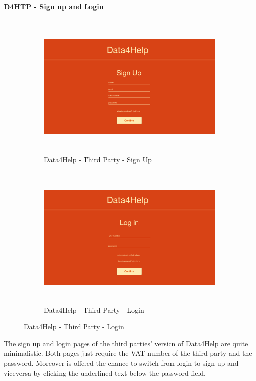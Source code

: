\paragraph{D4HTP - Sign up and Login}
\begin{figure}[H]
\centering
\begin{subfigure}{.5\textwidth}
  \centering
  \includegraphics[width=.9\linewidth, height = 7cm, keepaspectratio]{./Images/Mockups/Data4Help/D4HTP/D4HTP_SignUp.png}
  \caption{Data4Help - Third Party - Sign Up}
\end{subfigure}%
\begin{subfigure}{.5\textwidth}
  \centering
  \includegraphics[width = .9\linewidth, height = 7cm, keepaspectratio]{./Images/Mockups/Data4Help/D4HTP/D4HTP_Login.png}
  \caption{Data4Help - Third Party - Login}
\end{subfigure}
\end{figure}
The sign up and login pages of the third parties' version of Data4Help are quite minimalistic. 
Both pages just require the VAT number of the third party and the password. Moreover is offered the chance to switch from login to sign up and viceversa by clicking the underlined text below the password field. 



